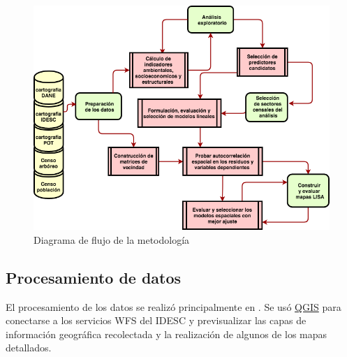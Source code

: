 \documentclass[12pt,]{book}
\begin{document}
\begin{figure}
\includegraphics[width=1\linewidth]{images/flujograma} \caption{Diagrama de flujo de la metodología}\label{fig:flujograma}
\end{figure}

\subsection{Procesamiento de datos}\label{procesamiento-de-datos}

El procesamiento de los datos se realizó principalmente en
\citet{R-base}. Se usó \href{http://www.qgis.org/es/site/}{QGIS} para
conectarse a los servicios WFS del IDESC y previsualizar las capas de
información geográfica recolectada y la realización de algunos de los
mapas detallados.
\end{document}

